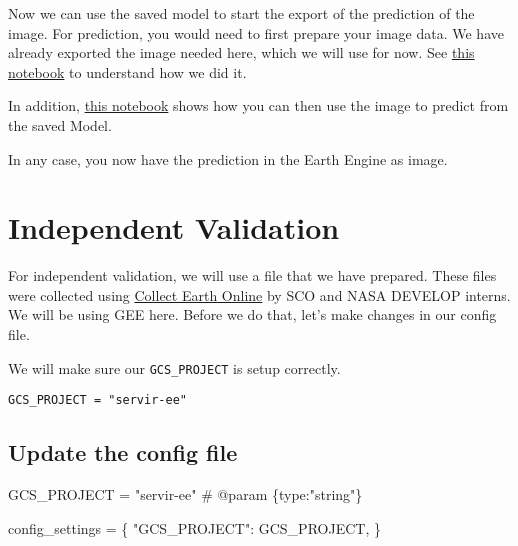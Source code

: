 \documentclass[
  letterpaper,
  DIV=11,
  numbers=noendperiod]{scrreprt}
\newenvironment{Shaded}{\begin{snugshade}}{\end{snugshade}}
\newcommand{\CommentTok}[1]{\textcolor[rgb]{0.37,0.37,0.37}{#1}}
\newcommand{\NormalTok}[1]{\textcolor[rgb]{0.00,0.23,0.31}{#1}}
\newcommand{\OperatorTok}[1]{\textcolor[rgb]{0.37,0.37,0.37}{#1}}
\newcommand{\StringTok}[1]{\textcolor[rgb]{0.13,0.47,0.30}{#1}}
\begin{document}
Now we can use the saved model to start the export of the prediction of
the image. For prediction, you would need to first prepare your image
data. We have already exported the image needed here, which we will use
for now. See
\href{https://colab.research.google.com/drive/1MZexam3GZKsQySQO9Jk_RPNyyMLmciEq?usp=sharing}{this
notebook} to understand how we did it.

In addition,
\href{https://colab.research.google.com/drive/1c59eWgw637n1aQfyIobOKIIulqKSXeqv?usp=sharing}{this
notebook} shows how you can then use the image to predict from the saved
Model.

In any case, you now have the prediction in the Earth Engine as image.

\section{Independent Validation}\label{independent-validation}

For independent validation, we will use a file that we have prepared.
These files were collected using
\href{https://app.collect.earth/home}{Collect Earth Online} by SCO and
NASA DEVELOP interns. We will be using GEE here. Before we do that,
let's make changes in our config file.

We will make sure our \texttt{GCS\_PROJECT} is setup correctly.

\begin{verbatim}
GCS_PROJECT = "servir-ee"
\end{verbatim}

\subsection{Update the config file}\label{update-the-config-file}

\begin{Shaded}
\begin{Highlighting}[]
\NormalTok{GCS\_PROJECT }\OperatorTok{=} \StringTok{"servir{-}ee"} \CommentTok{\# @param \{type:"string"\}}
\end{Highlighting}
\end{Shaded}

\begin{Shaded}
\begin{Highlighting}[]
\NormalTok{config\_settings }\OperatorTok{=}\NormalTok{ \{}
    \StringTok{"GCS\_PROJECT"}\NormalTok{: GCS\_PROJECT,}
\NormalTok{\}}
\end{Highlighting}
\end{Shaded}
\end{document}
